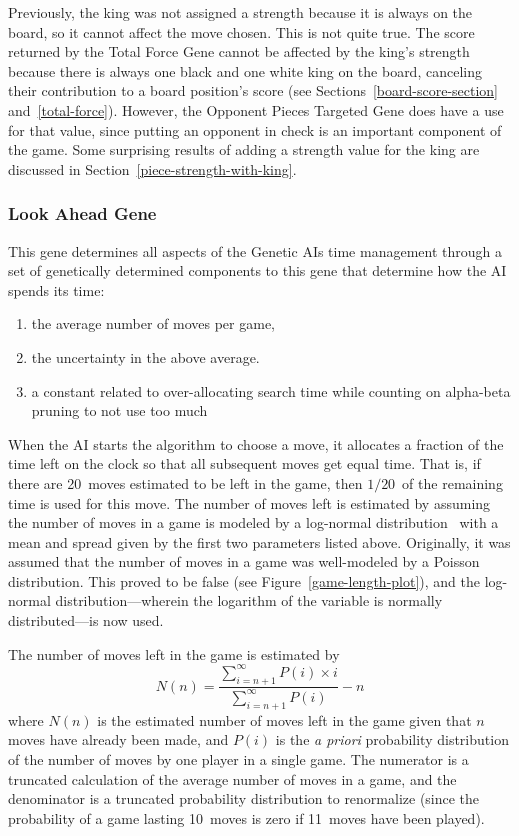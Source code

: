 \documentclass[letterpaper]{article}
\renewcommand{\_}{\allowbreak\textunderscore\allowbreak}
\begin{document}
Previously, the king was not assigned a strength because it is always on the board, so it cannot affect the move chosen. This is not quite true. The score returned by the Total Force Gene cannot be affected by the king's strength because there is always one black and one white king on the board, canceling their contribution to a board position's score (see Sections~\ref{board-score-section} and~\ref{total-force}). However, the Opponent Pieces Targeted Gene does have a use for that value, since putting an opponent in check is an important component of the game. Some surprising results of adding a strength value for the king are discussed in Section~\ref{piece-strength-with-king}.

\subsubsection{Look Ahead Gene}
This gene determines all aspects of the Genetic AIs time management through a set of genetically determined components to this gene that determine how the AI spends its time:
\begin{enumerate}
	\item the average number of moves per game,
	\item the uncertainty in the above average.
	\item a constant related to over-allocating search time while counting on alpha-beta pruning to not use too much
\end{enumerate}
When the AI starts the algorithm to choose a move, it allocates a fraction of the time left on the clock so that all subsequent moves get equal time. That is, if there are 20~moves estimated to be left in the game, then \(1/20\)~of the remaining time is used for this move. The number of moves left is estimated by assuming the number of moves in a game is modeled by a log-normal distribution~\cite{log-norm-wiki}\cite{log-norm-chess-se} with a mean and spread given by the first two parameters listed above. Originally, it was assumed that the number of moves in a game was well-modeled by a Poisson distribution. This proved to be false (see Figure~\ref{game-length-plot}), and the log-normal distribution---wherein the logarithm of the variable is normally distributed---is now used.

The number of moves left in the game is estimated by
\[N(n) = \frac{\sum_{i = n + 1}^\infty P(i)\times{}i}{\sum_{i = n + 1}^\infty P(i)} - n\]
where \(N(n)\) is the estimated number of moves left in the game given that \(n\) moves have already been made, and \(P(i)\) is the \emph{a priori} probability distribution of the number of moves by one player in a single game. The numerator is a truncated calculation of the average number of moves in a game, and the denominator is a truncated probability distribution to renormalize (since the probability of a game lasting 10~moves is zero if 11~moves have been played).
\end{document}
